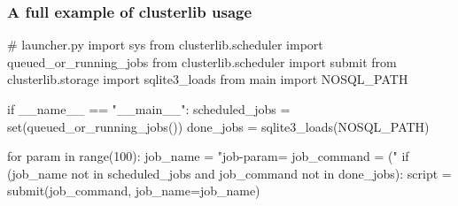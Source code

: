 \documentclass[11pt,compress,serif]{beamer}
\begin{document}
\begin{frame}[fragile=singleslide]
    \frametitle{A full example of clusterlib usage}
    
\begin{pythoncode}
# launcher.py
import sys
from clusterlib.scheduler import queued_or_running_jobs
from clusterlib.scheduler import submit
from clusterlib.storage import sqlite3_loads
from main import NOSQL_PATH

if __name__ == "__main__":
    scheduled_jobs = set(queued_or_running_jobs())
    done_jobs = sqlite3_loads(NOSQL_PATH)
    
    for param in range(100):
        job_name = "job-param=%
        job_command = ("%
        if (job_name not in scheduled_jobs and 
                job_command not in done_jobs):
            script = submit(job_command, job_name=job_name)
\end{pythoncode}
    
\end{frame}
\end{document}
